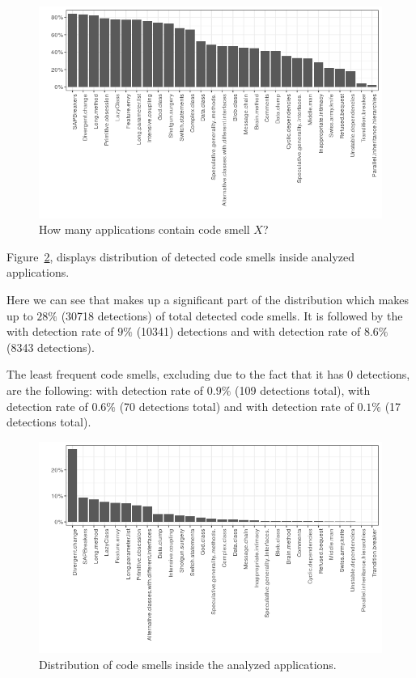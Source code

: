 \begin{figure}
    \includegraphics[scale=0.8]{figures/applications_contains_x_3.png}
    \caption{How many applications contain code smell $X$?}
    \label{fig:applicaitons_contain_x}
\end{figure}

Figure~\ref{fig:distribution}, displays distribution of detected code smells inside analyzed applications.

Here we can see that  makes up a significant part of the distribution which makes up to
$28\%$ (30718 detections) of total detected code smells.
It is followed by the  with detection rate of $9\%$ (10341) detections and 
with detection rate of $8.6\%$ (8343 detections).

The least frequent code smells, excluding  due to the fact that it has 0 detections,
are the following:  with detection rate of $0.9\%$ (109 detections total),
 with detection rate of $0.6\%$ (70 detections total) and
 with detection rate of $0.1\%$ (17 detections total).

\begin{figure}
    \includegraphics[scale=0.8]{figures/distribution_3.png}
    \caption{Distribution of code smells inside the analyzed applications.}
    \label{fig:distribution}
\end{figure}

\FloatBarrier

